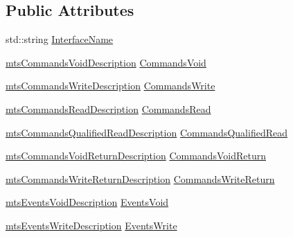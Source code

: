 \subsection*{Public Attributes}
\begin{DoxyCompactItemize}
\item 
std\+::string \hyperlink{classmts_interface_provided_description_a9d0b2061eb25931296b5d0b55b7147c0}{Interface\+Name}
\item 
\hyperlink{mts_interface_common_8h_a9aa601d6e65ef66e89806322ec4444ef}{mts\+Commands\+Void\+Description} \hyperlink{classmts_interface_provided_description_a3af9f3fa7e9c6acfce83fe652f9deffa}{Commands\+Void}
\item 
\hyperlink{mts_interface_common_8h_a0bcc3117036745a1e4da8fae37f9b3c2}{mts\+Commands\+Write\+Description} \hyperlink{classmts_interface_provided_description_a15be8bbb0b0c98fccae2bfb6a5424b94}{Commands\+Write}
\item 
\hyperlink{mts_interface_common_8h_a9e1511dfac508d23f474b42d08382987}{mts\+Commands\+Read\+Description} \hyperlink{classmts_interface_provided_description_a19c757b72b3b5dc1a91a7eb23cc2c0d7}{Commands\+Read}
\item 
\hyperlink{mts_interface_common_8h_ab70cb9469a75500c92633f16484bc699}{mts\+Commands\+Qualified\+Read\+Description} \hyperlink{classmts_interface_provided_description_a2553b42f30fe184eec7acbeeb0a42935}{Commands\+Qualified\+Read}
\item 
\hyperlink{mts_interface_common_8h_aec46641a384fd3d81c85ccce0e695c7d}{mts\+Commands\+Void\+Return\+Description} \hyperlink{classmts_interface_provided_description_ad0d205969cd06a1727814fac28eb1e9e}{Commands\+Void\+Return}
\item 
\hyperlink{mts_interface_common_8h_a2e1cd4e627518e43c1535b092e438ed0}{mts\+Commands\+Write\+Return\+Description} \hyperlink{classmts_interface_provided_description_aa9e3fc49bd7f8e1a156d29c951a534e7}{Commands\+Write\+Return}
\item 
\hyperlink{mts_interface_common_8h_a7aa44fd65d9bb6ddc7ee54f73763e091}{mts\+Events\+Void\+Description} \hyperlink{classmts_interface_provided_description_ab929da8fee6a684c4bea9d4de67fd214}{Events\+Void}
\item 
\hyperlink{mts_interface_common_8h_a0c9128c0dbc726c86555f331aa692ebc}{mts\+Events\+Write\+Description} \hyperlink{classmts_interface_provided_description_a676740e1b5728c67c10a76ac588d39aa}{Events\+Write}
\end{DoxyCompactItemize}


